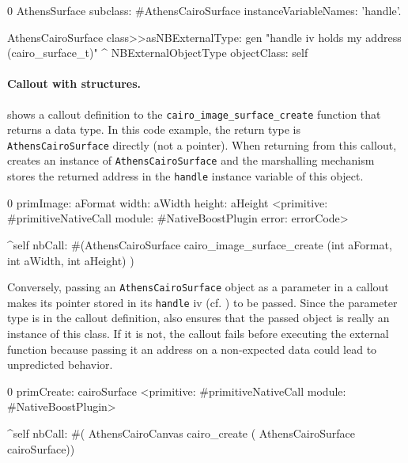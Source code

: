 \begin{stcode}[
	label={lst:AthensCairoSurface},
	caption={Example of C structure wrapping in \NB}]{0}
AthensSurface subclass: #AthensCairoSurface
	instanceVariableNames: 'handle'.

AthensCairoSurface class>>asNBExternalType: gen
	"handle iv holds my address (cairo_surface_t)"
	^ NBExternalObjectType objectClass: self
\end{stcode}

\paragraph{Callout with structures.}
 shows a callout definition to the \texttt{cairo\_image\_surface\_create} function that returns a  data type.
In this code example, the return type is \texttt{AthensCairoSurface} directly (not a pointer).
When returning from this callout, \NB creates an instance of \texttt{AthensCairoSurface} and the marshalling mechanism  stores the returned address in the \texttt{handle} instance variable of this object.

\begin{stcode}[
	label={lst:calloutOpaqueStruct},
	caption={Example of returning a structure by reference}]{0}
primImage: aFormat width: aWidth height: aHeight
	<primitive: #primitiveNativeCall
	 module: #NativeBoostPlugin
     error: errorCode>

	^self nbCall: #(AthensCairoSurface
		cairo_image_surface_create (int aFormat,
									int aWidth,
									int aHeight) )
\end{stcode}

Conversely, passing an \texttt{AthensCairoSurface} object as a parameter in a callout makes its pointer stored in its \texttt{handle} iv (cf. ) to be passed.
Since the parameter type is  in the callout definition, \NB also ensures that the passed object is really an instance of this class.
If it is not, the callout fails before executing the external function because passing it an address on a non-expected data could lead to unpredicted behavior.

\begin{stcode}[
	label={lst:calloutOpaqueStructParameter},
	caption={Example of passing a structure by reference}]{0}
primCreate: cairoSurface
	<primitive: #primitiveNativeCall
	 module: #NativeBoostPlugin>

	^self nbCall: #(
        AthensCairoCanvas cairo_create (
                  AthensCairoSurface cairoSurface))
\end{stcode}


